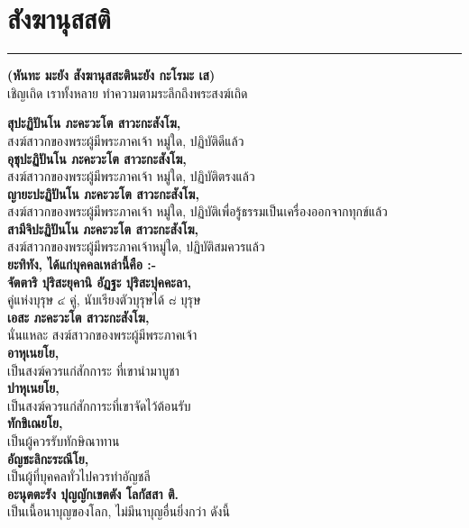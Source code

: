 \documentclass[12pt]{article}
\begin{document}
\section{สังฆานุสสติ}
\hrule
\begin{center}
\textbf{(หันทะ มะยัง สังฆานุสสะตินะยัง กะโรมะ เส)}\\
เชิญเถิด เราทั้งหลาย ทำความตามระลึกถึงพระสงฆ์เถิด
\end{center}
\textbf{สุปะฏิปันโน ภะคะวะโต สาวะกะสังโฆ,}\\
\indent สงฆ์สาวกของพระผู้มีพระภาคเจ้า หมู่ใด, ปฏิบัติดีแล้ว\\
\textbf{อุชุปะฏิปันโน ภะคะวะโต สาวะกะสังโฆ,}\\
\indent สงฆ์สาวกของพระผู้มีพระภาคเจ้า หมู่ใด, ปฏิบัติตรงแล้ว\\
\textbf{ญายะปะฏิปันโน ภะคะวะโต สาวะกะสังโฆ,}\\
\indent สงฆ์สาวกของพระผู้มีพระภาคเจ้า หมู่ใด, ปฏิบัติเพื่อรู้ธรรมเป็นเครื่องออกจากทุกข์แล้ว\\
\textbf{สามีจิปะฏิปันโน ภะคะวะโต สาวะกะสังโฆ,}\\
\indent สงฆ์สาวกของพระผู้มีพระภาคเจ้าหมู่ใด, ปฏิบัติสมควรแล้ว\\
\textbf{ยะทิทัง, ได้แก่บุคคลเหล่านี้คือ :-\\
\indent จัตตาริ ปุริสะยุคานิ อัฏฐะ ปุริสะปุคคะลา,}\\
\indent คู่แห่งบุรุษ ๔ คู่, นับเรียงตัวบุรุษได้ ๘ บุรุษ \\
\textbf{เอสะ ภะคะวะโต สาวะกะสังโฆ,}\\
\indent นั่นแหละ สงฆ์สาวกของพระผู้มีพระภาคเจ้า\\
\textbf{อาหุเนยโย,}\\
\indent เป็นสงฆ์ควรแก่สักการะ ที่เขานำมาบูชา\\
\textbf{ปาหุเนยโย,}\\
\indent เป็นสงฆ์ควรแก่สักการะที่เขาจัดไว้ต้อนรับ\\
\textbf{ทักขิเณยโย,}\\
\indent เป็นผู้ควรรับทักษิณาทาน\\
\textbf{อัญชะลิกะระณีโย,}\\
\indent เป็นผู้ที่บุคคลทั่วไปควรทำอัญชลี\\
\textbf{อะนุตตะรัง ปุญญักเขตตัง โลกัสสา ติ.}\\
\indent เป็นเนื้อนาบุญของโลก, ไม่มีนาบุญอื่นยิ่งกว่า ดังนี้\\

\pagebreak
\end{document}
